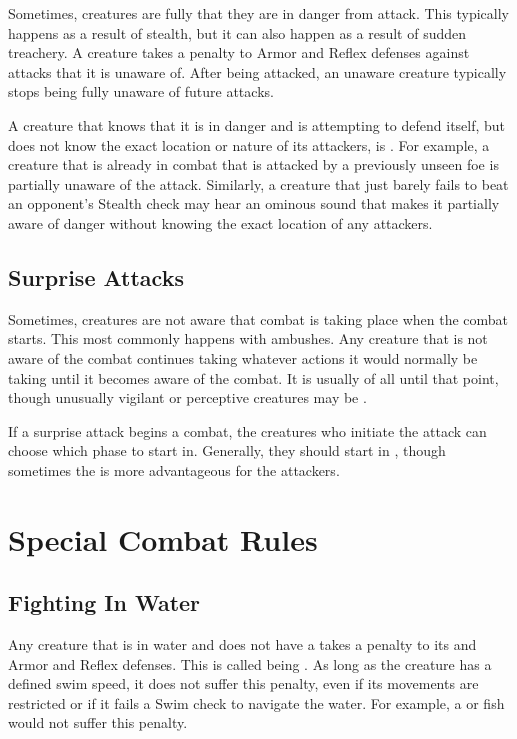   Sometimes, creatures are fully \unaware that they are in danger from attack.
  This typically happens as a result of stealth, but it can also happen as a result of sudden treachery.
  A creature takes a  penalty to Armor and Reflex defenses against attacks that it is unaware of.
  After being attacked, an unaware creature typically stops being fully unaware of future attacks.

  A creature that knows that it is in danger and is attempting to defend itself, but does not know the exact location or nature of its attackers, is \partiallyunaware.
  For example, a creature that is already in combat that is attacked by a previously unseen foe is partially unaware of the attack.
  Similarly, a creature that just barely fails to beat an opponent's Stealth check may hear an ominous sound that makes it partially aware of danger without knowing the exact location of any attackers.

  \subsection{Surprise Attacks}\label{Surprise Attacks}
    Sometimes, creatures are not aware that combat is taking place when the combat starts.
    This most commonly happens with ambushes.
    Any creature that is not aware of the combat continues taking whatever actions it would normally be taking until it becomes aware of the combat.
    It is usually \unaware of all until that point, though unusually vigilant or perceptive creatures may be \partiallyunaware.

    If a surprise attack begins a combat, the creatures who initiate the attack can choose which phase to start in.
    Generally, they should start in , though sometimes the  is more advantageous for the attackers.

\section{Special Combat Rules}

  \subsection{Fighting In Water}\label{Fighting In Water}
    Any creature that is in water and does not have a  takes a  penalty to its  and Armor and Reflex defenses.
    This is called being .
    As long as the creature has a defined swim speed, it does not suffer this penalty, even if its movements are restricted or if it fails a Swim check to navigate the water.
    For example, a \immobilized or \grappled fish would not suffer this penalty.


